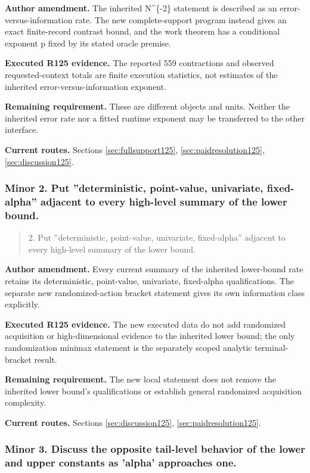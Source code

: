 \noindent\textbf{Author amendment.} The inherited N\textasciicircum{}\{-2\} statement is described as an error-versus-information rate. The new complete-support program instead gives an exact finite-record contrast bound, and the work theorem has a conditional exponent p fixed by its stated oracle premise.

\noindent\textbf{Executed R125 evidence.} The reported 559 contractions and observed requested-context totals are finite execution statistics, not estimates of the inherited error-versus-information exponent.

\noindent\textbf{Remaining requirement.} These are different objects and units. Neither the inherited error rate nor a fitted runtime exponent may be transferred to the other interface.

\noindent\textbf{Current routes.} Sections \ref{sec:fullsupport125}, \ref{sec:paidresolution125}, \ref{sec:discussion125}.

\subsubsection{Minor 2. Put ''deterministic, point-value, univariate, fixed-alpha'' adjacent to every high-level summary of the lower bound.}

\begin{quote}\small
2. Put ''deterministic, point-value, univariate, fixed-alpha'' adjacent to every high-level summary of the lower bound.
\end{quote}

\noindent\textbf{Author amendment.} Every current summary of the inherited lower-bound rate retains its deterministic, point-value, univariate, fixed-alpha qualifications. The separate new randomized-action bracket statement gives its own information class explicitly.

\noindent\textbf{Executed R125 evidence.} The new executed data do not add randomized acquisition or high-dimensional evidence to the inherited lower bound; the only randomization minimax statement is the separately scoped analytic terminal-bracket result.

\noindent\textbf{Remaining requirement.} The new local statement does not remove the inherited lower bound's qualifications or establish general randomized acquisition complexity.

\noindent\textbf{Current routes.} Sections \ref{sec:discussion125}, \ref{sec:paidresolution125}.

\subsubsection{Minor 3. Discuss the opposite tail-level behavior of the lower and upper constants as 'alpha' approaches one.}

